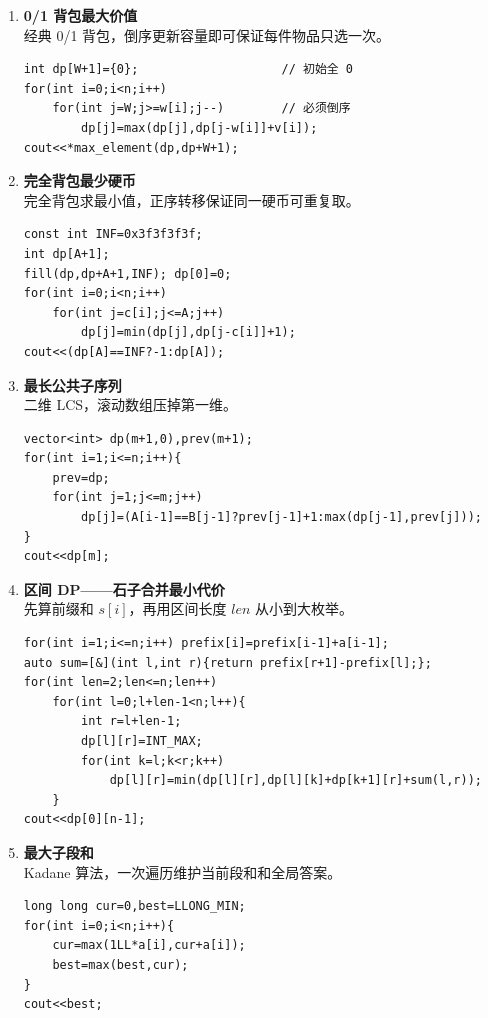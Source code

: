 \documentclass{article}
\begin{document}
\begin{enumerate}[label=\textbf{DP\arabic*.}]
  \item \textbf{0/1 背包最大价值}\\
    经典 0/1 背包，倒序更新容量即可保证每件物品只选一次。
\begin{lstlisting}
int dp[W+1]={0};                    // 初始全 0
for(int i=0;i<n;i++)
    for(int j=W;j>=w[i];j--)        // 必须倒序
        dp[j]=max(dp[j],dp[j-w[i]]+v[i]);
cout<<*max_element(dp,dp+W+1);
\end{lstlisting}

  \item \textbf{完全背包最少硬币}\\
    完全背包求最小值，正序转移保证同一硬币可重复取。
\begin{lstlisting}
const int INF=0x3f3f3f3f;
int dp[A+1];
fill(dp,dp+A+1,INF); dp[0]=0;
for(int i=0;i<n;i++)
    for(int j=c[i];j<=A;j++)
        dp[j]=min(dp[j],dp[j-c[i]]+1);
cout<<(dp[A]==INF?-1:dp[A]);
\end{lstlisting}

  \item \textbf{最长公共子序列}\\
    二维 LCS，滚动数组压掉第一维。
\begin{lstlisting}
vector<int> dp(m+1,0),prev(m+1);
for(int i=1;i<=n;i++){
    prev=dp;
    for(int j=1;j<=m;j++)
        dp[j]=(A[i-1]==B[j-1]?prev[j-1]+1:max(dp[j-1],prev[j]));
}
cout<<dp[m];
\end{lstlisting}

  \item \textbf{区间 DP——石子合并最小代价}\\
    先算前缀和 $s[i]$，再用区间长度 $len$ 从小到大枚举。
\begin{lstlisting}
for(int i=1;i<=n;i++) prefix[i]=prefix[i-1]+a[i-1];
auto sum=[&](int l,int r){return prefix[r+1]-prefix[l];};
for(int len=2;len<=n;len++)
    for(int l=0;l+len-1<n;l++){
        int r=l+len-1;
        dp[l][r]=INT_MAX;
        for(int k=l;k<r;k++)
            dp[l][r]=min(dp[l][r],dp[l][k]+dp[k+1][r]+sum(l,r));
    }
cout<<dp[0][n-1];
\end{lstlisting}

  \item \textbf{最大子段和}\\
    Kadane 算法，一次遍历维护当前段和和全局答案。
\begin{lstlisting}
long long cur=0,best=LLONG_MIN;
for(int i=0;i<n;i++){
    cur=max(1LL*a[i],cur+a[i]);
    best=max(best,cur);
}
cout<<best;
\end{lstlisting}
\end{enumerate}
\end{document}
